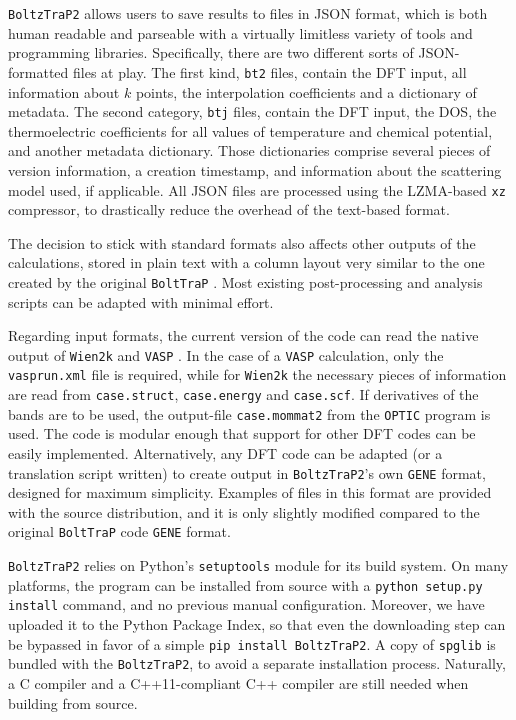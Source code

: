 \documentclass[final,5p,times,twocolumn,sort&compress]{elsarticle}
\begin{document}
\texttt{BoltzTraP2} allows users to save results to files in JSON format, which is both human readable and parseable with a virtually limitless variety of tools and programming libraries. Specifically, there are two different sorts of JSON-formatted files at play. The first kind, \texttt{bt2} files, contain the DFT input, all information about $k$ points, the interpolation coefficients and a dictionary of metadata. The second category, \texttt{btj} files, contain the DFT input, the DOS, the thermoelectric coefficients for all values of temperature and chemical potential, and another metadata dictionary. Those dictionaries comprise several pieces of version information, a creation timestamp, and information about the scattering model used, if applicable. All JSON files are processed using the LZMA-based \texttt{xz} compressor, to drastically reduce the overhead of the text-based format.

The decision to stick with standard formats also affects other outputs of the calculations, stored in plain text with a column layout very similar to the one created by the original \texttt{BoltTraP} \cite{BoltzTraP}. Most existing post-processing and analysis scripts can be adapted with minimal effort.

Regarding input formats, the current version of the code can read the native output of \texttt{Wien2k} \cite{gmcpc, wien2k} and \texttt{VASP} \cite{VASP2}. In the case of a \texttt{VASP} calculation, only the \texttt{vasprun.xml} file is required, while for \texttt{Wien2k} the necessary pieces of information are read from \texttt{case.struct}, \texttt{case.energy} and \texttt{case.scf}. If derivatives of the bands are to be used, the output-file \texttt{case.mommat2} from the \texttt{OPTIC} \cite{OPTIC} program is used. The code is modular enough that support for other DFT codes can be easily implemented. Alternatively, any DFT code can be adapted (or a translation script written) to create output in \texttt{BoltzTraP2}'s own \texttt{GENE} format, designed for maximum simplicity. Examples of files in this format are provided with the source distribution, and it is only slightly modified compared to the original \texttt{BoltTraP} code \texttt{GENE} format.

\texttt{BoltzTraP2} relies on Python's \texttt{setuptools} module for its build system. On many platforms, the program can be installed from source with a \texttt{python setup.py install} command, and no previous manual configuration. Moreover, we have uploaded it to the Python Package Index, so that even the downloading step can be bypassed in favor of a simple \texttt{pip install BoltzTraP2}. A copy of \texttt{spglib} is bundled with the \texttt{BoltzTraP2}, to avoid a separate installation process. Naturally, a C compiler and a C++11-compliant C++ compiler are still needed when building from source.
\end{document}
